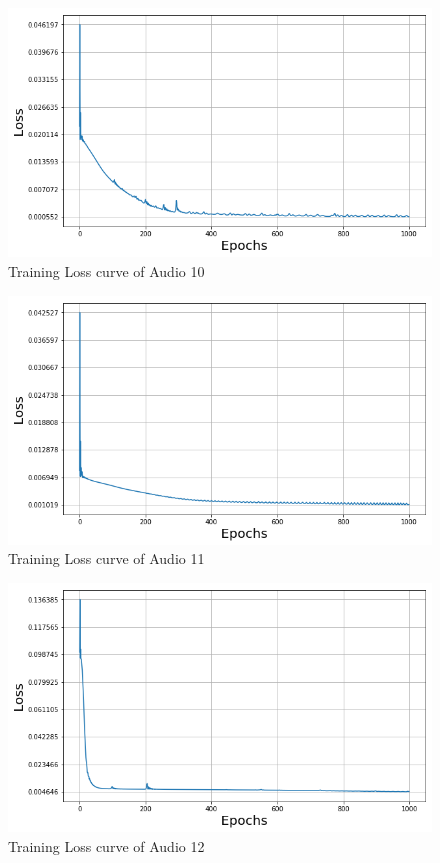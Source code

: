 \documentclass{ioereport}
\begin{document}
    \begin{figure}[H]
        \centering
        \includegraphics[width=\linewidth]{assets/audio_loss_curves/12seconds.png}
        \caption{Training Loss curve of Audio 10}
        \label{fig:audio-loss-curve-10}
    \end{figure}
    \begin{figure}[H]
        \centering
        \includegraphics[width=\linewidth]{assets/audio_loss_curves/24seconds.png}
        \caption{Training Loss curve of Audio 11}
        \label{fig:audio-loss-curve-11}
    \end{figure}
    \begin{figure}[H]
        \centering
        \includegraphics[width=\linewidth]{assets/audio_loss_curves/music_with_instrument.png}
        \caption{Training Loss curve of Audio 12}
        \label{fig:audio-loss-curve-12}
    \end{figure}
\end{document}
